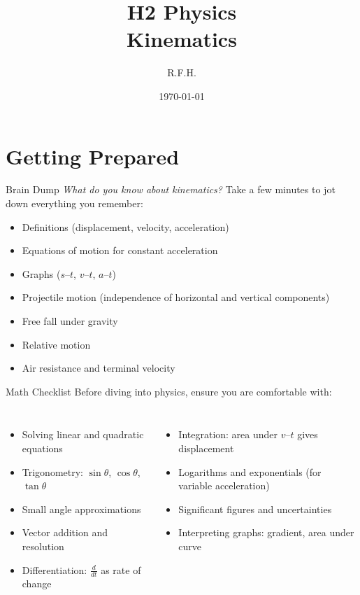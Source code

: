 \documentclass{beamer}
\title{H2 Physics \\ Kinematics}
\author{R.F.H.}
\date{\today}
\begin{document}
\begin{frame}
\titlepage
\end{frame}

\section{Getting Prepared}

\begin{frame}[shrink=15]{Brain Dump}
\centering
\Large
\textit{What do you know about kinematics?}
\vfill
Take a few minutes to jot down everything you remember:
\begin{itemize}
    \item Definitions (displacement, velocity, acceleration)
    \item Equations of motion for constant acceleration
    \item Graphs ($s$–$t$, $v$–$t$, $a$–$t$)
    \item Projectile motion (independence of horizontal and vertical components)
    \item Free fall under gravity
    \item Relative motion
    \item Air resistance and terminal velocity
\end{itemize}
\end{frame}

\begin{frame}{Math Checklist}
Before diving into physics, ensure you are comfortable with:
\begin{columns}[T]
\begin{itemize}
    \item Solving linear and quadratic equations
    \item Trigonometry: $\sin\theta$, $\cos\theta$, $\tan\theta$
    \item Small angle approximations
    \item Vector addition and resolution
    \item Differentiation: $\frac{d}{dt}$ as rate of change
\end{itemize}
\begin{itemize}
    \item Integration: area under $v$–$t$ gives displacement
    \item Logarithms and exponentials (for variable acceleration)
    \item Significant figures and uncertainties
    \item Interpreting graphs: gradient, area under curve
\end{itemize}
\end{columns}
\end{frame}
\end{document}
